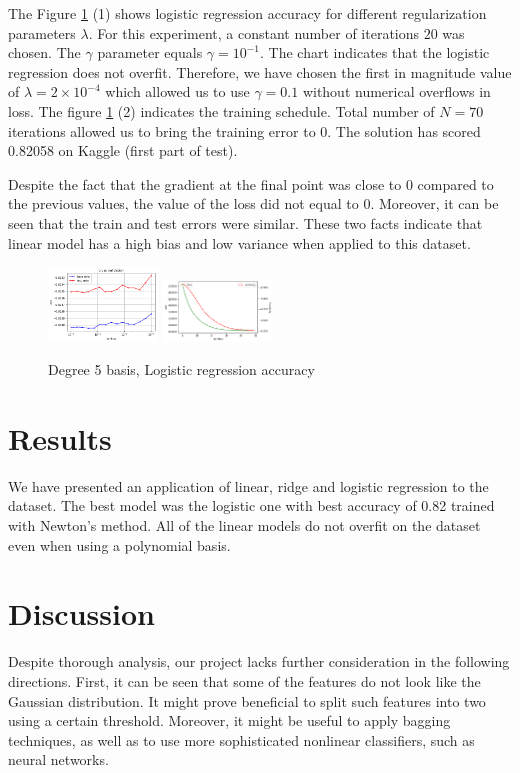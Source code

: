 \documentclass[10pt,conference,compsocconf]{IEEEtran}
\begin{document}
The Figure \ref{fig:logreg} (1) shows logistic regression accuracy for different regularization parameters $\lambda$. For this experiment, a constant number of iterations $20$ was chosen. The $\gamma$ parameter equals $\gamma=10^{-1}$. The chart indicates that the logistic regression does not overfit. Therefore, we have chosen the first in magnitude value of $\lambda=2\times 10^{-4}$ which allowed us to use $\gamma=0.1$ without numerical overflows in loss. The figure \ref{fig:logreg} (2) indicates the training schedule. Total number of $N=70$ iterations allowed us to bring the training error to 0. The solution has scored 0.82058 on Kaggle \cite{kaggle} (first part of test).

Despite the fact that the gradient at the final point was close to $0$ compared to the previous values, the value of the loss did not equal to $0$. Moreover, it can be seen that the train and test errors were similar. These two facts indicate that linear model has a high bias and low variance when applied to this dataset.

\begin{figure}[!htb]
	\centering \includegraphics[width=110px]{logistic_lambda_cv_netwon_nobatch}
	\centering \includegraphics[width=110px]{logistic_01}
	
	\caption{Degree 5 basis, Logistic regression accuracy}
	\label{fig:logreg}
\end{figure}

\section{Results}
We have presented an application of linear, ridge and logistic regression to the dataset. The best model was the logistic one with best accuracy of 0.82 trained with Newton's method. All of the linear models do not overfit on the dataset even when using a polynomial basis.
\section{Discussion}
Despite thorough analysis, our project lacks further consideration in the following directions. First, it can be seen that some of the features do not look like the Gaussian distribution. It might prove beneficial to split such features into two using a certain threshold. Moreover, it might be useful to apply bagging techniques, as well as to use more sophisticated nonlinear classifiers, such as neural networks.
\end{document}
